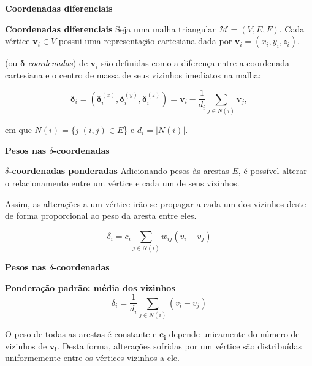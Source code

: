 \begin{frame}{{\bf \color{blue} Coordenadas diferenciais}}

\begin{block}{\bf Coordenadas diferenciais}
Seja uma malha triangular $\mathcal{M} = (V, E, F)$. Cada vértice $\mathbf{v}_i \in V$ possui uma representação cartesiana dada por $\mathbf{v}_i = (x_i,y_i,z_i)$.

\medskip

 (ou $\mathbf{\delta}$\textit{-coordenadas}) de $\mathbf{v}_i$ são definidas como a diferença entre a coordenada cartesiana e o centro de massa de seus vizinhos imediatos na malha:

\begin{equation}
\mathbf{\delta}_i = (\mathbf{\delta}_i^{(x)}, \mathbf{\delta}_i^{(y)}, \mathbf{\delta}_i^{(z)}) = \mathbf{v}_i - \frac{1}{d_i} \sum_{j \in N(i)} \mathbf{v}_j,
\label{eq_delta}
\end{equation}

\noindent em que $N(i) = \{j|(i,j) \in E$\} e $d_i = |N(i)|$.
\end{block}

\end{frame}


\begin{frame}{{\bf \color{blue} Pesos nas $\delta$-coordenadas}}
\begin{block}{\bf $\delta$-coordenadas ponderadas}
Adicionando pesos às arestas $E$, é possível alterar o relacionamento entre um vértice e cada um de seus vizinhos.

\medskip

Assim, as alterações a um vértice irão se propagar a cada um dos vizinhos deste de forma proporcional ao peso da aresta entre eles.

\medskip

$$\delta_i = c_i \sum_{j \in N(i)} w_{ij} (v_i - v_j)$$
\end{block}
\end{frame}

\begin{frame}{{\bf \color{blue} Pesos nas $\delta$-coordenadas}}
\begin{block}{\bf Ponderação padrão: média dos vizinhos}
$$\delta_i = \frac{1}{d_i} \sum_{j \in N(i)} (v_i - v_j)$$

O peso de todas as arestas é constante e $\mathbf{c_i}$ depende unicamente do número de vizinhos de $\mathbf{v_i}$. Desta forma, alterações sofridas por um vértice são distribuídas uniformemente entre os vértices vizinhos a ele.
\end{block}
\end{frame}

